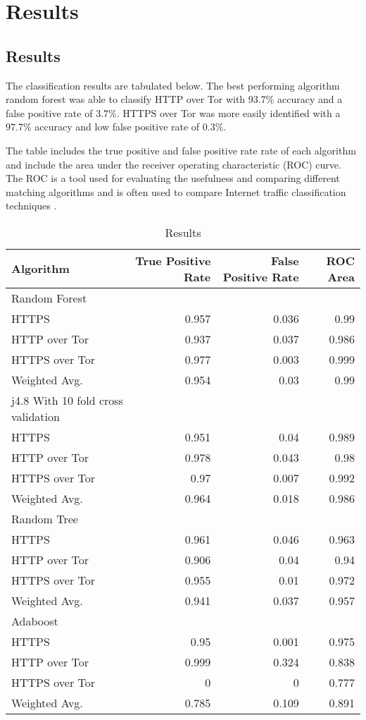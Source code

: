 \chapter{Results}

\section{Results}

The classification results are tabulated below. The best performing algorithm
random forest was able to classify HTTP over Tor with 93.7\% accuracy and a
false positive rate of 3.7\%. HTTPS over Tor was more easily identified with a
97.7\% accuracy and low false positive rate of 0.3\%.

The table includes the true positive and false positive rate rate of each algorithm and
include the area under the receiver operating characteristic (ROC) curve. The
ROC is a tool used for evaluating the usefulness and comparing different
matching algorithms and is often used to compare Internet traffic
classification techniques \parencite{citeulike:167557,Nguyen:2008p3837}.

\begin{table}[H]
  \begin{tabular}{lrrr}
    \toprule
    Algorithm & True Positive Rate & False Positive Rate & ROC Area \\
    \midrule
    Random Forest\\
    \midrule
    HTTPS & 0.957 & 0.036 & 0.99\\
    HTTP over Tor & 0.937 & 0.037 & 0.986\\
    HTTPS over Tor & 0.977 & 0.003 & 0.999\\
    Weighted Avg. & 0.954 & 0.03 & 0.99\\
    \midrule
    j4.8 With 10 fold cross validation\\
    \midrule
    HTTPS & 0.951 & 0.04 & 0.989\\
    HTTP over Tor & 0.978 & 0.043 & 0.98\\
    HTTPS over Tor & 0.97 & 0.007 & 0.992\\
    Weighted Avg. & 0.964 & 0.018 & 0.986\\
    \midrule
    Random Tree\\
    \midrule
    HTTPS & 0.961 & 0.046 & 0.963\\
    HTTP over Tor & 0.906 & 0.04 & 0.94\\
    HTTPS over Tor & 0.955 & 0.01 & 0.972\\
    Weighted Avg. & 0.941 & 0.037 & 0.957\\
    \midrule
    Adaboost\\
    \midrule
    HTTPS & 0.95 & 0.001 & 0.975\\
    HTTP over Tor & 0.999 & 0.324 & 0.838\\
    HTTPS over Tor & 0 & 0 & 0.777\\
    Weighted Avg. & 0.785 & 0.109 & 0.891\\
    \bottomrule
  \end{tabular}
  \caption{Results}
  \label{table:results}
\end{table}

